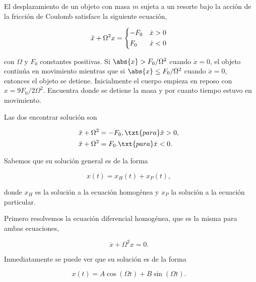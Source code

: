 \documentclass[../main.tex]{subfiles}
\begin{document}
\begin{problema}
	El desplazamiento de un objeto con masa \(m\) sujeta a un resorte
	bajo la acción de la fricción de Coulomb satisface la siguiente
	ecuación,

	\begin{equation}
		\ddot{x} + \Omega^{2}x =
		\begin{dcases}
			-F_{0} & \dot{x} > 0 \\
			F_{0}  & \dot{x} < 0 \\
		\end{dcases}
	\end{equation}

	con \(\Omega\) y \(F_{0}\) constantes positivas. Si \(\abs{x} > F_{0}/\Omega^{2}\)
	cuando \(\dot{x} = 0\), el objeto continúa en movimiento mientras
	que si \(\abs{x} \leq F_{0}/\Omega^{2}\) cuando \(\dot{x} = 0\),
	entonces el objeto se detiene. Inicialmente el cuerpo empieza
	en reposo con \(x = 9F_{0}/2\Omega^{2}\). Encuentra donde se detiene
	la masa y por cuanto tiempo estuvo en movimiento.
\end{problema}

\startsolution

Las dos encontrar solución son

\begin{align*}
	\ddot{x} + \Omega^{2} & = -F_{0}, \txt{para} \dot{x} > 0, \\
	\ddot{x} + \Omega^{2} & = F_{0}. \txt{para} \dot{x} < 0.
\end{align*}

Sabemos que su solución general es de la forma

\begin{equation*}
	x(t) = x_{H}(t) + x_{P}(t),
\end{equation*}

donde \(x_{H}\) es la solución a la ecuación homogénea y \(x_{P}\) la solución
a la ecuación particular.

Primero resolvemos la ecuación diferencial homogénea, que es la misma para ambas
ecuaciones,

\begin{equation*}
	\ddot{x} + \Omega^{2}x = 0.
\end{equation*}

Inmediatamente se puede ver que su solución es de la forma

\begin{equation*}
	x(t) = A\cos(\Omega t) + B\sin(\Omega t).
\end{equation*}
\end{document}
